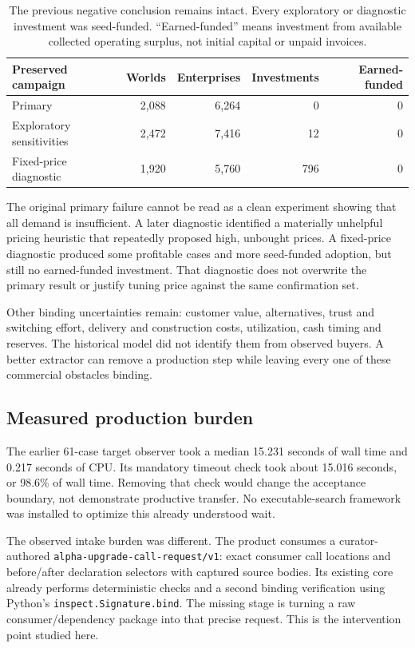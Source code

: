 \documentclass[11pt,a4paper]{article}
\begin{document}
\begin{table}[htbp]
\centering\small
\begin{tabularx}{\textwidth}{Xrrrr}
\toprule
Preserved campaign & Worlds & Enterprises & Investments & Earned-funded\\
\midrule
Primary & 2,088 & 6,264 & 0 & 0\\
Exploratory sensitivities & 2,472 & 7,416 & 12 & 0\\
Fixed-price diagnostic & 1,920 & 5,760 & 796 & 0\\
\bottomrule
\end{tabularx}
\caption{The previous negative conclusion remains intact. Every exploratory or diagnostic investment was seed-funded. ``Earned-funded'' means investment from available collected operating surplus, not initial capital or unpaid invoices.}
\end{table}

The original primary failure cannot be read as a clean experiment showing that all demand is insufficient. A later diagnostic identified a materially unhelpful pricing heuristic that repeatedly proposed high, unbought prices. A fixed-price diagnostic produced some profitable cases and more seed-funded adoption, but still no earned-funded investment. That diagnostic does not overwrite the primary result or justify tuning price against the same confirmation set.

Other binding uncertainties remain: customer value, alternatives, trust and switching effort, delivery and construction costs, utilization, cash timing and reserves. The historical model did not identify them from observed buyers. A better extractor can remove a production step while leaving every one of these commercial obstacles binding.

\subsection{Measured production burden}
The earlier 61-case target observer took a median 15.231 seconds of wall time and 0.217 seconds of CPU. Its mandatory timeout check took about 15.016 seconds, or 98.6\% of wall time. Removing that check would change the acceptance boundary, not demonstrate productive transfer. No executable-search framework was installed to optimize this already understood wait.

The observed intake burden was different. The product consumes a curator-authored \texttt{alpha-upgrade-call-request/v1}: exact consumer call locations and before/after declaration selectors with captured source bodies. Its existing core already performs deterministic checks and a second binding verification using Python's \texttt{inspect.Signature.bind}. The missing stage is turning a raw consumer/dependency package into that precise request. This is the intervention point studied here.
\end{document}
